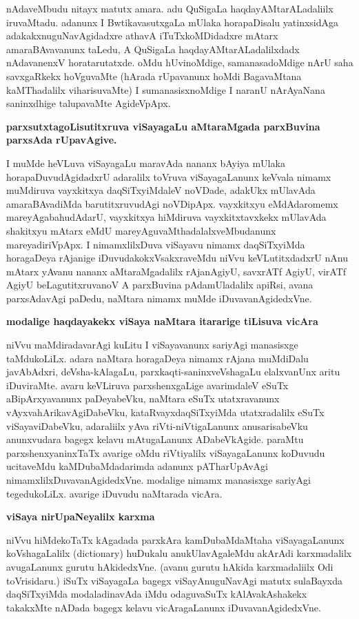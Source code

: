 nAdaveMbudu nitayx matutx amara. adu QuSigaLa haqdayAMtarALadaliilx iruvaMtadu. adanunx I BwtikavasutxgaLa mUlaka horapaDisalu yatinxsidAga adakakxnuguNavAgidadxre athavA iTuTxkoMDidadxre mAtarx amaraBAvavanunx taLedu, A QuSigaLa haqdayAMtarALadalilxdadx nAdavanenxV horatarutatxde. oMdu hUvinoMdige, samanasadoMdige nArU saha savxgaRkekx hoVguvaMte (hArada rUpavanunx hoMdi BagavaMtana kaMThadalilx viharisuvaMte) I sumanasisxnoMdige I naranU nArAyaNana saninxdhige talupavaMte AgideVpApx.

{\bf parxsutxtagoLisutitxruva viSayagaLu aMtaraMgada parxBuvina parxsAda rUpavAgive.}

I muMde heVLuva viSayagaLu maravAda nananx bAyiya mUlaka horapaDuvudAgidadxrU adaralilx toVruva viSayagaLanunx keVvala nimamx muMdiruva vayxkitxya daqSiTxyiMdaleV noVDade, adakUkx mUlavAda amaraBAvadiMda barutitxruvudAgi noVDipApx. vayxkitxyu eMdAdaromemx mareyAgabahudAdarU, vayxkitxya hiMdiruva vayxkitxtavxkekx mUlavAda shakitxyu mAtarx eMdU mareyAguvaMthadalalxveMbudanunx mareyadiriVpApx. I nimamxlilxDuva viSayavu nimamx daqSiTxyiMda horagaDeya rAjanige iDuvudakokxVsakxraveMdu niVvu keVLutitxdadxrU nAnu mAtarx yAvanu nananx aMtaraMgadalilx rAjanAgiyU, savxrATf AgiyU, virATf AgiyU beLagutitxruvanoV A parxBuvina pAdamUladalilx apiRsi, avana parxsAdavAgi paDedu, naMtara nimamx muMde iDuvavanAgidedxVne.

{\bf modalige haqdayakekx viSaya naMtara itararige tiLisuva vicAra}

niVvu maMdiradavarAgi kuLitu I viSayavanunx sariyAgi manasisxge taMdukoLiLx. adara naMtara horagaDeya nimamx rAjana muMdiDalu javAbAdxri, deVsha-kAlagaLu, parxkaqti-saninxveVshagaLu elalxvanUnx aritu iDuviraMte. avaru keVLiruva parxshenxgaLige avarimdaleV eSuTx aBipArxyavanunx paDeyabeVku, naMtara eSuTx utatxravanunx vAyxvahArikavAgiDabeVku, kataRvayxdaqSiTxyiMda utatxradalilx eSuTx viSayaviDabeVku, adaraliilx yAva riVti-niVtigaLanunx anusarisabeVku anunxvudara bagegx kelavu mAtugaLanunx ADabeVkAgide. paraMtu parxshenxyaninxTaTx avarige oMdu riVtiyalilx viSayagaLanunx koDuvudu ucitaveMdu kaMDubaMdadarimda adanunx pATharUpAvAgi nimamxlilxDuvavanAgidedxVne. modalige nimamx manasisxge sariyAgi tegedukoLiLx. avarige iDuvudu naMtarada vicAra.

{\bf viSaya nirUpaNeyalilx karxma}

niVvu hiMdekoTaTx kAgadada parxkAra kamDubaMdaMtaha viSayagaLanunx koVshagaLalilx ({\rm dictionary}) huDukalu anukUlavAgaleMdu akArAdi karxmadalilx avugaLanunx gurutu hAkidedxVne. (avanu gurutu hAkida karxmadaliilx Odi toVrisidaru.) iSuTx viSayagaLa bagegx viSayAnuguNavAgi matutx sulaBayxda daqSiTxyiMda modaladinavAda iMdu odaguvaSuTx kAlAvakAshakekx takakxMte nADada bagegx kelavu vicAragaLanunx iDuvavanAgidedxVne.

